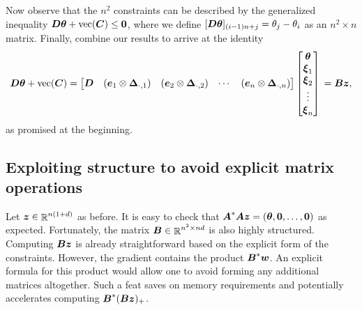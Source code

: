 \documentclass{article}
\begin{document}
Now observe that the \(n^{2}\) constraints can be described by the generalized inequality \(\boldsymbol{D} \boldsymbol{\theta} + \mathop{\rm vec}\nolimits(\boldsymbol{C}) \le \boldsymbol{0}\), where we define \([\boldsymbol{D} \boldsymbol{\theta}]_{(i-1)n+j} = \theta_{j} - \theta_{i}\) as an \(n^{2} \times n\) matrix.
Finally, combine our results to arrive at the identity
\begin{equation*}
    \boldsymbol{D} \boldsymbol{\theta} + \mathop{\rm vec}\nolimits(\boldsymbol{C})
    =
    \begin{bmatrix}
        \boldsymbol{D}
        & (\boldsymbol{e}_{1} \otimes \boldsymbol{\Delta}_{\cdot,1})
        & (\boldsymbol{e}_{2} \otimes \boldsymbol{\Delta}_{\cdot,2})
        & \cdots
        & (\boldsymbol{e}_{n} \otimes \boldsymbol{\Delta}_{\cdot,n})
    \end{bmatrix}
    \begin{bmatrix}
        \boldsymbol{\theta} \\
        \boldsymbol{\xi}_{1} \\
        \boldsymbol{\xi}_{2} \\
        \vdots \\
        \boldsymbol{\xi}_{n}
    \end{bmatrix} \\
    =
    \boldsymbol{B} \boldsymbol{z},
\end{equation*}
as promised at the beginning.

\subsection*{Exploiting structure to avoid explicit matrix operations}

Let \(\boldsymbol{z} \in \mathop{\mathbb{R}}\nolimits^{n(1+d)}\) as before.
It is easy to check that \(\boldsymbol{A}^{\ast} \boldsymbol{A} \boldsymbol{z} = (\boldsymbol{\theta}, \boldsymbol{0}, \ldots, \boldsymbol{0})\) as expected.
Fortunately, the matrix \(\boldsymbol{B} \in \mathop{\mathbb{R}}\nolimits^{n^{2} \times nd}\) is also highly structured.
Computing \(\boldsymbol{B} \boldsymbol{z}\) is already straightforward based on the explicit form of the constraints.
However, the gradient contains the product \(\boldsymbol{B}^{\ast} \boldsymbol{w}\).
An explicit formula for this product would allow one to avoid forming any additional matrices altogether.
Such a feat saves on memory requirements and potentially accelerates computing \(\boldsymbol{B}^{\ast} (\boldsymbol{B} \boldsymbol{z})_{+}\).
\end{document}
